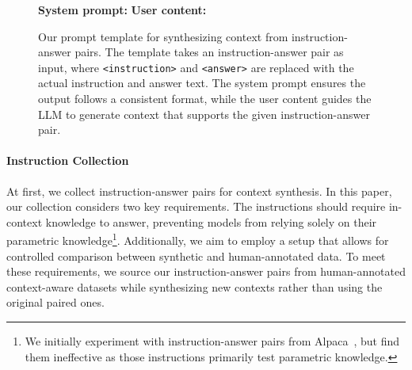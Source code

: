 \begin{figure}[htb]
  \centering\small
  \textbf{System prompt:}
  \vspace{1ex}
  \noindent{}
  \vspace{1ex}
  \textbf{User content:}
  \vspace{1ex}
  \noindent{}
\caption{Our prompt template for synthesizing context from instruction-answer pairs. The template takes an instruction-answer pair as input, where \texttt{<instruction>} and \texttt{<answer>} are replaced with the actual instruction and answer text. The system prompt ensures the output follows a consistent format, while the user content guides the LLM to generate context that supports the given instruction-answer pair.}
\label{fig:prompt-template-context-synthesis}
\end{figure}

\noindent\paragraph{Instruction Collection}
At first, we collect instruction-answer pairs for context synthesis.
In this paper, our collection considers two key requirements.
The instructions should require in-context knowledge to answer, preventing models from relying solely on their parametric knowledge\footnote{We initially experiment with instruction-answer pairs from Alpaca~\cite{wang2023instruct}, but find them ineffective as those instructions primarily test parametric knowledge.}.
Additionally, we aim to employ a setup that allows for controlled comparison between synthetic and human-annotated data.
To meet these requirements, we source our instruction-answer pairs from human-annotated context-aware datasets while synthesizing new contexts rather than using the original paired ones.

